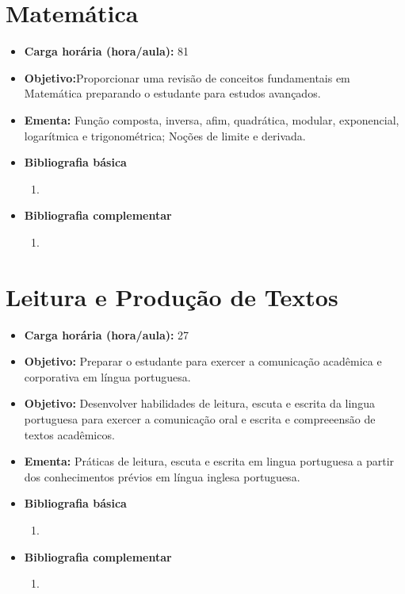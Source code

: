 \documentclass[11pt,fleqn]{book} %
\begin{document}
\section{Matemática}\label{1_matematica}
\begin{itemize}
	\item \textbf{Carga horária (hora/aula):} 81
	\item \textbf{Objetivo:}Proporcionar uma revisão de conceitos fundamentais em Matemática preparando o estudante para estudos avançados.
	\item \textbf{Ementa:} 
	Função composta, inversa, afim, quadrática, modular, exponencial, logarítmica e trigonométrica; Noções de limite e derivada.
	\item \textbf{Bibliografia básica}
	\begin{enumerate}
		\item 
	\end{enumerate}
	\item \textbf{Bibliografia complementar}
	\begin{enumerate}
		\item 
	\end{enumerate}	
\end{itemize}


\newpage
\section{Leitura e Produção de Textos}\label{1_leitprodtextos}
\begin{itemize}
	\item \textbf{Carga horária (hora/aula):} 27
	\item \textbf{Objetivo:} Preparar o estudante para exercer a comunicação acadêmica e corporativa em língua portuguesa.
	\item \textbf{Objetivo:} Desenvolver habilidades de leitura, escuta e escrita da lingua portuguesa para exercer a comunicação oral e escrita e compreeensão de textos acadêmicos.
	\item \textbf{Ementa:} 
	Práticas de leitura, escuta e escrita em lingua portuguesa a partir dos conhecimentos prévios em língua inglesa	portuguesa.
	\item \textbf{Bibliografia básica}
	\begin{enumerate}
		\item 
	\end{enumerate}
	\item \textbf{Bibliografia complementar}
	\begin{enumerate}
		\item 
	\end{enumerate}	
\end{itemize}
\end{document}
